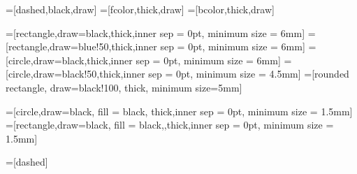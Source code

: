 =[dashed,black,draw]
=[fcolor,thick,draw]
=[bcolor,thick,draw]

=[rectangle,draw=black,thick,inner sep = 0pt, minimum size = 6mm]
=[rectangle,draw=blue!50,thick,inner sep = 0pt, minimum size = 6mm]
=[circle,draw=black,thick,inner sep = 0pt, minimum size = 6mm] %
=[circle,draw=black!50,thick,inner sep = 0pt, minimum size = 4.5mm] %
=[rounded rectangle, draw=black!100, thick, minimum size=5mm] %

=[circle,draw=black, fill = black, thick,inner sep = 0pt, minimum size = 1.5mm]
=[rectangle,draw=black, fill = black,,thick,inner sep = 0pt, minimum size = 1.5mm]

=[dashed]
  

\def\nodeCS(#1,#2)(#3,#4,#5){ 	%
	\node at (#1,#2) (#3) [gauge,black] {#4};
	\draw[CScolor] (#3) ++(6pt,-7pt) node[anchor=west] {\tiny#5};
}

\def\flavorCS(#1,#2)(#3,#4,#5){ 	%
	\node at (#1,#2) (#3) [flavor,black] {#4};
	\draw[CScolor] (#3) ++(6pt,-8pt) node[anchor=west] {\tiny#5};
}

\def\arrowBF(#1,#2)(#3){ %
	\begin{scope}[every node/.style={auto, outer sep=-1pt}]
	\path (#1) edge[->-] node[BFcolor,midway] {\tiny#3} (#2);
	\end{scope}
}

\def\arrowBFlr(#1,#2)(#3,#4){ %
	\begin{scope}[every node/.style={auto=#4, outer sep=-1pt}]
	\path (#1) edge[->-] node[BFcolor,midway] {\tiny#3} (#2);
	\end{scope}
}

\def\dottedBF(#1,#2)(#3){ %
	\begin{scope}[every node/.style={auto, outer sep=-1pt}]
	\path (#1) edge[BFline] node[BFcolor,midway] {\tiny#3} (#2);
	\end{scope}
}


